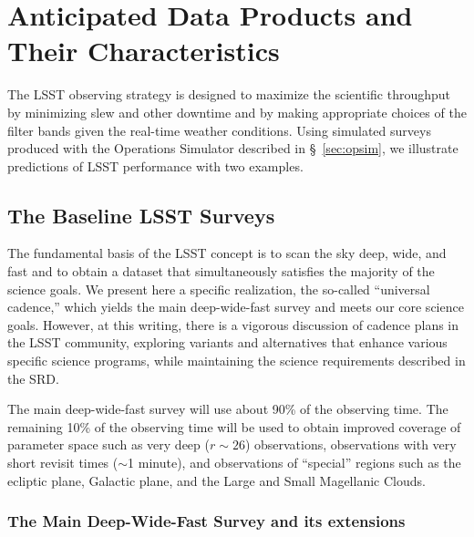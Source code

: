 \section{Anticipated Data Products and Their Characteristics}
\label{Sec:dataprod}

The LSST observing strategy is designed to maximize the scientific
throughput by minimizing slew and other downtime and by making appropriate
choices of the filter bands given the real-time weather conditions.
Using simulated surveys produced with the Operations Simulator described in \S~\ref{sec:opsim},
we illustrate predictions of LSST performance with two examples.


\subsection{The Baseline LSST Surveys}
\label{sec:baseline}

The fundamental basis of the LSST concept is to scan the sky deep, wide, and
fast and to obtain a dataset that simultaneously satisfies the majority
of the science goals. We present here a specific realization, the
so-called ``universal cadence,'' which yields the main deep-wide-fast
survey and meets our core science goals.  However, at this writing,
there is a vigorous discussion of cadence plans in the LSST community,
exploring variants and alternatives that enhance various specific
science programs, while maintaining the science requirements described
in the SRD.

The main deep-wide-fast survey
will use about 90\% of the observing time. The remaining 10\% of the observing
time will be used to obtain improved coverage of parameter space such as
very deep ($r\sim26$) observations, observations with very short revisit
times ($\sim$1 minute), and observations of ``special'' regions such as the
ecliptic plane, Galactic plane, and the Large and Small Magellanic Clouds.

\subsubsection{The Main Deep-Wide-Fast Survey and its extensions}


